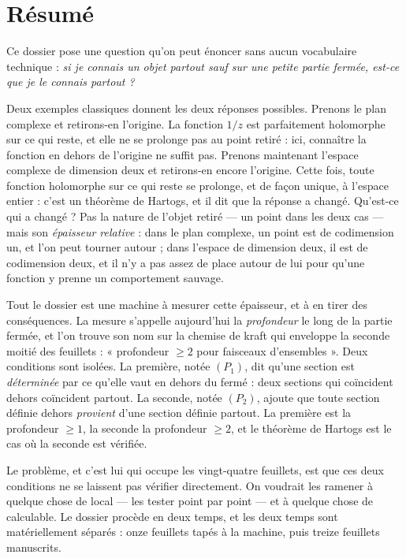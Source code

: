 \documentclass[11pt,a4paper]{article}
\begin{document}
\section*{Résumé}

\begin{resume}
Ce dossier pose une question qu'on peut énoncer sans aucun vocabulaire
technique : \emph{si je connais un objet partout sauf sur une petite partie
fermée, est-ce que je le connais partout ?}

Deux exemples classiques donnent les deux réponses possibles. Prenons le plan
complexe et retirons-en l'origine. La fonction $1/z$ est parfaitement
holomorphe sur ce qui reste, et elle ne se prolonge pas au point retiré : ici,
connaître la fonction en dehors de l'origine ne suffit pas. Prenons maintenant
l'espace complexe de dimension deux et retirons-en encore l'origine. Cette
fois, toute fonction holomorphe sur ce qui reste se prolonge, et de façon
unique, à l'espace entier : c'est un théorème de Hartogs, et il dit que la
réponse a changé. Qu'est-ce qui a changé ? Pas la nature de l'objet retiré — un
point dans les deux cas — mais son \emph{épaisseur relative} : dans le plan
complexe, un point est de codimension un, et l'on peut tourner autour ; dans
l'espace de dimension deux, il est de codimension deux, et il n'y a pas assez
de place autour de lui pour qu'une fonction y prenne un comportement sauvage.

Tout le dossier est une machine à mesurer cette épaisseur, et à en tirer des
conséquences. La mesure s'appelle aujourd'hui la \emph{profondeur} le long de
la partie fermée, et l'on trouve son nom sur la chemise de kraft qui enveloppe
la seconde moitié des feuillets : « profondeur $\geqslant 2$ pour faisceaux
d'ensembles ». Deux conditions sont isolées. La première, notée $(P_1)$, dit
qu'une section est \emph{déterminée} par ce qu'elle vaut en dehors du fermé :
deux sections qui coïncident dehors coïncident partout. La seconde, notée
$(P_2)$, ajoute que toute section définie dehors \emph{provient} d'une section
définie partout. La première est la profondeur $\geqslant 1$, la seconde la
profondeur $\geqslant 2$, et le théorème de Hartogs est le cas où la seconde
est vérifiée.

Le problème, et c'est lui qui occupe les vingt-quatre feuillets, est que ces
deux conditions ne se laissent pas vérifier directement. On voudrait les
ramener à quelque chose de local — les tester point par point — et à quelque
chose de calculable. Le dossier procède en deux temps, et les deux temps sont
matériellement séparés : onze feuillets tapés à la machine, puis treize
feuillets manuscrits.


\end{resume}
\end{document}
